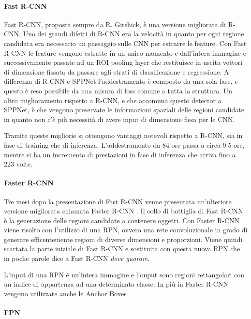 \paragraph{Fast R-CNN}
Fast R-CNN, proposta sempre da R. Girshick, \cite{girshick2015fast} è una versione migliorata di R-CNN. Uno dei grandi difetti di R-CNN era la velocità in quanto per ogni regione candidata era necessario un passaggio sulle \ac{CNN} per estrarre le feature. 
Con Fast R-CNN le feature vengono estratte in un unico momento e dall'intera immagine e successivamente passate ad  un \ac{ROI} pooling layer che restituisce in uscita vettori di dimensione fissata da passare agli strati di classificazione e regressione. 
A differenza di R-CNN e \ac{SPPNet} l'addestramento è composto da una sola fase, e questo è reso possibile da una misura di loss comune a tutta la struttura. 
Un altro miglioramento rispetto a R-CNN, e che accomuna questo detector a \ac{SPPNet}, è che vengono preservate le informazioni spaziali delle regioni candidate in quanto non c'è più necessità di avere input di dimensione fissa per le \ac{CNN}. 

Tramite queste migliorie si ottengono vantaggi notevoli rispetto a R-CNN, sia in fase di training che di inferenza. L'addestramento da 84 ore passa a circa 9.5 ore, mentre si ha un incremento di prestazioni in fase di inferenza che arriva fino a 223 volte. 
\paragraph{Faster R-CNN}
Tre mesi dopo la presentazione di Fast R-CNN venne presentata un'ulteriore versione migliorata chiamata Faster R-CNN \cite{ren2015faster}. Il collo di bottiglia di Fast R-CNN è la generazione delle regioni candidate a contenere oggetti. Con Faster R-CNN viene risolto con l'utilizzo di una \ac{RPN}, ovvero una rete convoluzionale in grado di generare efficentemente regioni di diverse dimensioni e proporzioni. Viene quindi scartata la parte iniziale di Fast R-CNN e sostituita con questa nuova \ac{RPN} che in poche parole dice a Fast R-CNN \textit{dove guarare}.

L'input di una \ac{RPN} è un'intera immagine e l'ouput sono regioni rettangolari con un indice di appartenza ad una determinata classe. 
In più in Faster R-CNN vengono utilizzate anche le Anchor Boxes 
\paragraph{FPN}

